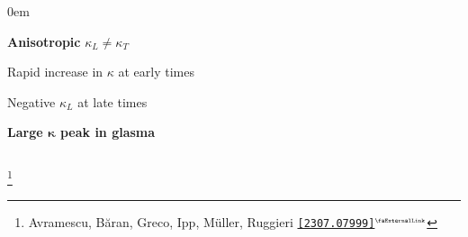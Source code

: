 \documentclass[aspectratio=169,11pt,usenames,dvipsnames]{beamer}
\renewcommand{\thefootnote}{\color{customblue}\faPaperPlaneO}
\newcommand\blfootnote[1]{%
  \begingroup
  \renewcommand\thefootnote{}\footnote{#1}%
  \addtocounter{footnote}{-1}%
  \endgroup
}
\begin{document}
\begin{frame}
\begin{columns}[onlytextwidth,t]
        \begin{itemize}\itemsep0em 
            \footnotesize
            {\color{lightgray}\item {\bfseries Anisotropic} $\kappa_L\neq\kappa_T$
            \item Rapid increase in $\kappa$ at early times 
            \item Negative $\kappa_L$ at late times}
            \item {\bfseries\color{palviolet}Large $\boldsymbol{\kappa}$ peak in glasma}
        \end{itemize}    
              
    \end{columns}
    \blfootnote{\scriptsize Avramescu, Băran, Greco, Ipp, Müller, Ruggieri  \href{https://arxiv.org/abs/2307.07999}{{\color{palgold}\texttt{[2307.07999]}$^\text{\tiny\faExternalLink}$}}}
\end{frame}

\end{document}
